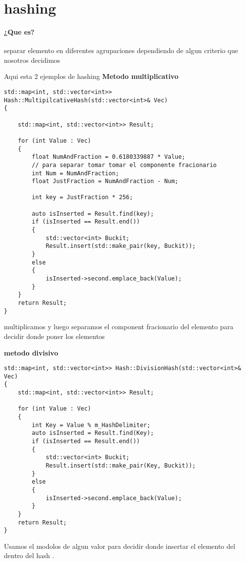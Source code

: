 \documentclass{article}
\begin{document}
\section{hashing}

\paragraph{¿Que es?} separar elemento en diferentes agrupaciones dependiendo de algun criterio que nosotros decidimos 

Aqui esta 2 ejemplos de hashing 
\textbf{Metodo multiplicativo}
\begin{lstlisting}  
std::map<int, std::vector<int>> Hash::MultipilcativeHash(std::vector<int>& Vec)
{

	std::map<int, std::vector<int>> Result;

	for (int Value : Vec)
	{
		float NumAndFraction = 0.6180339887 * Value;
		// para separar tomar tomar el componente fracionario 
		int Num = NumAndFraction;
		float JustFraction = NumAndFraction - Num;

		int key = JustFraction * 256;

		auto isInserted = Result.find(key);
		if (isInserted == Result.end())
		{
			std::vector<int> Buckit;
			Result.insert(std::make_pair(key, Buckit));
		}
		else
		{
			isInserted->second.emplace_back(Value);
		}
	}
	return Result;
}

\end{lstlisting} 
multiplicamos y luego separamos el component fracionario del elemento para decidir donde poner los elementos 


\textbf{metodo divisivo }
\begin{lstlisting}  
std::map<int, std::vector<int>> Hash::DivisionHash(std::vector<int>& Vec)
{
	std::map<int, std::vector<int>> Result;

	for (int Value : Vec)
	{
		int Key = Value % m_HashDelimiter;
		auto isInserted = Result.find(Key);
		if (isInserted == Result.end())
		{
			std::vector<int> Buckit;
			Result.insert(std::make_pair(Key, Buckit));
		}
		else
		{
			isInserted->second.emplace_back(Value);
		}
	}
	return Result;
}
\end{lstlisting} 
Usamos el modolos de algun valor para decidir donde insertar el elemento del dentro del hash . 
\end{document}
